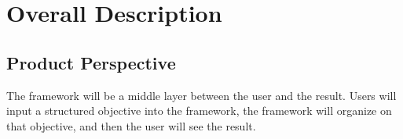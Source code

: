 \documentclass[draftclsnofoot, onecolumn, compsoc, 10pt]{IEEEtran}
\begin{document}

\section{Overall Description}
\subsection{Product Perspective}
The framework will be a middle layer between the user and the result. Users will input a structured objective into the framework, the framework will organize on that objective, and then the user will see the result. 








\end{document}

